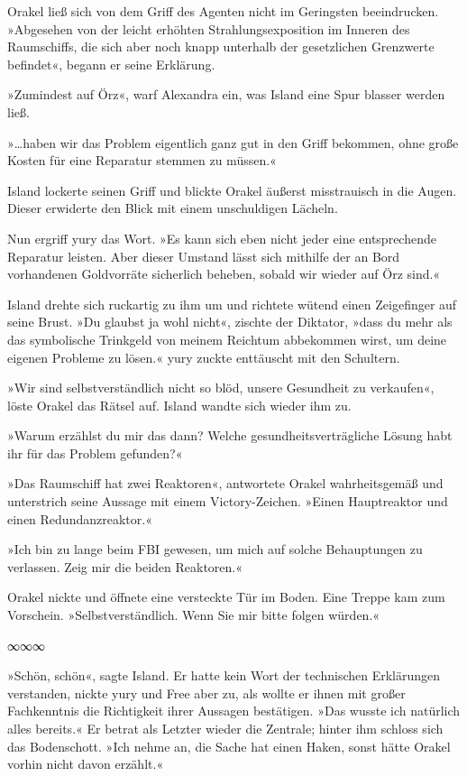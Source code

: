 Orakel ließ sich von dem Griff des Agenten nicht im Geringsten beeindrucken. »Abgesehen von der leicht erhöhten Strahlungsexposition im Inneren des Raumschiffs, die sich aber noch knapp unterhalb der gesetzlichen Grenzwerte befindet«, begann er seine Erklärung.

»Zumindest auf Örz«, warf Alexandra ein, was Island eine Spur blasser werden ließ.

»…haben wir das Problem eigentlich ganz gut in den Griff bekommen, ohne große Kosten für eine Reparatur stemmen zu müssen.«

Island lockerte seinen Griff und blickte Orakel äußerst misstrauisch in die Augen. Dieser erwiderte den Blick mit einem unschuldigen Lächeln.

Nun ergriff yury das Wort. »Es kann sich eben nicht jeder eine entsprechende Reparatur leisten. Aber dieser Umstand lässt sich mithilfe der an Bord vorhandenen Goldvorräte sicherlich beheben, sobald wir wieder auf Örz sind.«

Island drehte sich ruckartig zu ihm um und richtete wütend einen Zeigefinger auf seine Brust. »Du glaubst ja wohl nicht«, zischte der Diktator, »dass du mehr als das symbolische Trinkgeld von meinem Reichtum abbekommen wirst, um deine eigenen Probleme zu lösen.« yury zuckte enttäuscht mit den Schultern.

»Wir sind selbstverständlich nicht so blöd, unsere Gesundheit zu verkaufen«, löste Orakel das Rätsel auf. Island wandte sich wieder ihm zu.

»Warum erzählst du mir das dann? Welche gesundheitsverträgliche Lösung habt ihr für das Problem gefunden?«

»Das Raumschiff hat zwei Reaktoren«, antwortete Orakel wahrheitsgemäß und unterstrich seine Aussage mit einem Victory-Zeichen. »Einen Hauptreaktor und einen Redundanzreaktor.«

»Ich bin zu lange beim FBI gewesen, um mich auf solche Behauptungen zu verlassen. Zeig mir die beiden Reaktoren.«

Orakel nickte und öffnete eine versteckte Tür im Boden. Eine Treppe kam zum Vorschein. »Selbstverständlich. Wenn Sie mir bitte folgen würden.«

\begin{center}
	∞∞∞
\end{center}

»Schön, schön«, sagte Island. Er hatte kein Wort der technischen Erklärungen verstanden, nickte yury und Free aber zu, als wollte er ihnen mit großer Fachkenntnis die Richtigkeit ihrer Aussagen bestätigen. »Das wusste ich natürlich alles bereits.« Er betrat als Letzter wieder die Zentrale; hinter ihm schloss sich das Bodenschott. »Ich nehme an, die Sache hat einen Haken, sonst hätte Orakel vorhin nicht davon erzählt.«

